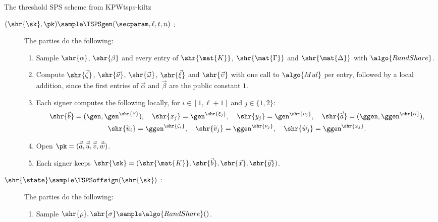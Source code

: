 \begin{protocolbox}{The threshold SPS scheme from KPW}{tsps-kiltz}

  \begin{description}

    \item[$(\shr{\sk}, \pk) \sample \TSPSgen(\secparam, \ell, t, n)$ :] The
parties do the following:

      \begin{enumerate}

	\item Sample $\shr{\alpha}$, $\shr{\beta}$ and every entry of
$\shr{\mat{K}}$, $\shr{\mat{\Gamma}}$ and $\shr{\mat{\Delta}}$ with
$\algo{RandShare}$.

	\item Compute $\shr{\vec{\zeta}}$, $\shr{\vec{\nu}}$, $\shr{\vec{\omega}}$,
$\shr{\vec{\xi}}$ and $\shr{\vec{\upsilon}}$ with one call to $\algo{Mul}$ per
entry, followed by a local addition, since the first entries of $\vec{\alpha}$ and
$\vec{\beta}$ are the public constant $1$.

	\item Each signer computes the following locally, for $i \in [1, \ell+1]$
and $j \in \{1, 2\}$:
	  \begin{gather*}
	    \shr{\vec{b}} = (\gen, \gen^{\shr{\beta}}), \quad \shr{x_j} =
\gen^{\shr{\xi_j}}, \quad \shr{y_j} = \gen^{\shr{\upsilon_j}}, \quad
\shr{\vec{\widetilde{a}}} = (\ggen, \ggen^{\shr{\alpha}}), \\
	    \shr{\widetilde{u}_i} = \ggen^{\shr{\zeta_i}}, \quad
\shr{\widetilde{v}_j} = \ggen^{\shr{\nu_j}}, \quad \shr{\widetilde{w}_j} =
\ggen^{\shr{\omega_j}}.
	  \end{gather*}

	\item Open $\pk = (\vec{\widetilde{a}}, \vec{\widetilde{u}},
\vec{\widetilde{v}}, \vec{\widetilde{w}})$.

	\item Each signer keeps $\shr{\sk} = (\shr{\mat{K}}, \shr{\vec{b}},
\shr{\vec{x}}, \shr{\vec{y}})$.

      \end{enumerate}

    \item[$\shr{\state} \sample \TSPSoffsign(\shr{\sk})$ :] The parties do the
following:

      \begin{enumerate}

	\item Sample $\shr{\rho}, \shr{\sigma} \sample \algo{RandShare}()$.


\end{enumerate}
\end{description}
\end{protocolbox}
